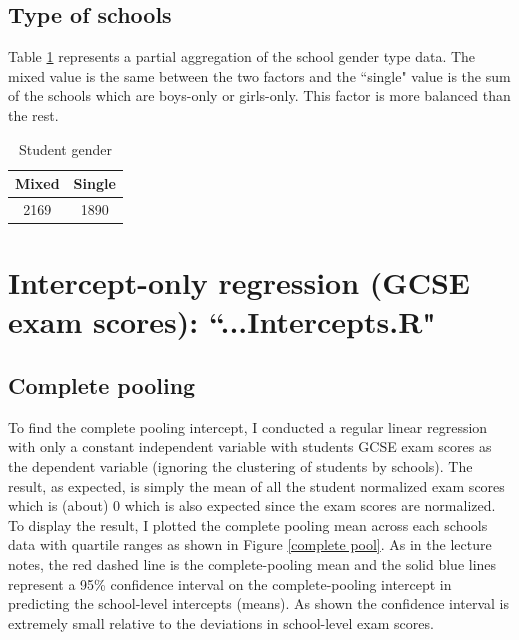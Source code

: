 \documentclass{article}
\begin{document}
\subsection{Type of schools}
Table \ref{tab5} represents a partial aggregation of the school gender type data. The mixed value is the same between the two factors and the ``single" value is the sum of the schools which are boys-only or girls-only. This factor is more balanced than the rest.

\begin{table}[H]
\centering
\caption{Student gender}
\label{tab5}
\begin{tabular}{@{}  c c @{}}
\textbf{Mixed} & \textbf{Single} \\\midrule
2169 &1890 \\
\bottomrule
\hline
\end{tabular}
\end{table}

\section{Intercept-only regression (GCSE exam scores): ``...Intercepts.R"}
\subsection{Complete pooling}
To find the complete pooling intercept, I conducted a regular linear regression with only a constant independent variable with students GCSE exam scores as the dependent variable (ignoring the clustering of students by schools). The result, as expected, is simply the mean of all the student normalized exam scores which is (about) $0$ which is also expected since the exam scores are normalized. To display the result, I plotted the complete pooling mean across each schools data with quartile ranges as shown in Figure \ref{complete pool}. As in the lecture notes, the red dashed line is the complete-pooling mean and the solid blue lines represent a 95\% confidence interval on the complete-pooling intercept in  predicting the school-level intercepts (means). As shown the confidence interval is extremely small relative to the deviations in school-level exam scores.
\end{document}
